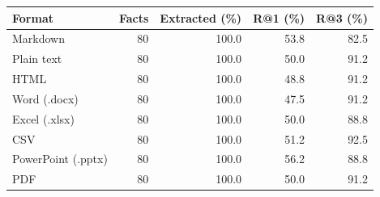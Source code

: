 \begin{tabular}{lrrrr}
\toprule
Format & Facts & Extracted (\%) & R@1 (\%) & R@3 (\%)\\
\midrule
Markdown & 80 & 100.0 & 53.8 & 82.5\\
Plain text & 80 & 100.0 & 50.0 & 91.2\\
HTML & 80 & 100.0 & 48.8 & 91.2\\
Word (.docx) & 80 & 100.0 & 47.5 & 91.2\\
Excel (.xlsx) & 80 & 100.0 & 50.0 & 88.8\\
CSV & 80 & 100.0 & 51.2 & 92.5\\
PowerPoint (.pptx) & 80 & 100.0 & 56.2 & 88.8\\
PDF & 80 & 100.0 & 50.0 & 91.2\\
\bottomrule
\end{tabular}
